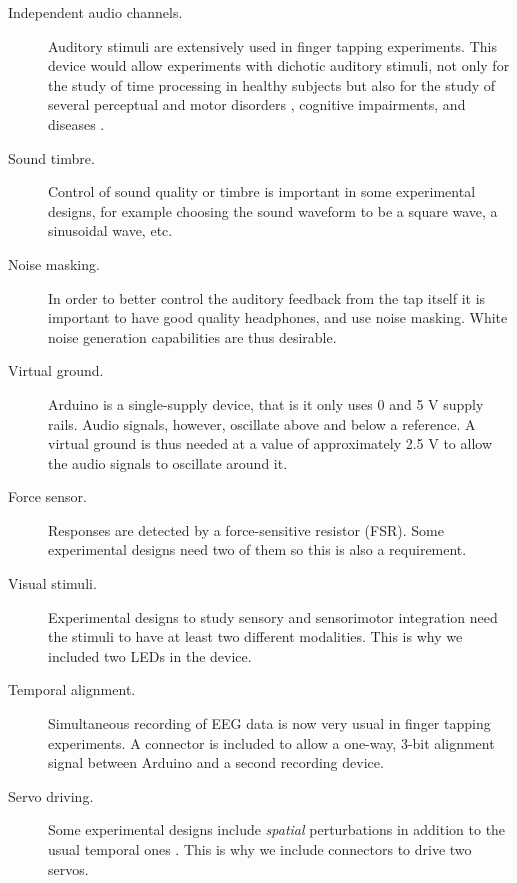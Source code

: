 \documentclass[twocolumn]{article}
\begin{document}
\begin{description}
    \item[Independent audio channels.] Auditory stimuli are extensively used in finger tapping experiments. This device would allow experiments with dichotic auditory stimuli, not only for the study of time processing in healthy subjects \cite{Piazza1977} but also for the study of several perceptual and motor disorders \cite{Hugdahl1989}, cognitive impairments, and diseases \cite{Sebaiti2022}.

    \item[Sound timbre.] Control of sound quality or timbre is important in some experimental designs, for example choosing the sound waveform to be a square wave, a sinusoidal wave, etc.

    \item[Noise masking.] In order to better control the auditory feedback from the tap itself it is important to have good quality headphones, and use noise masking. White noise generation capabilities are thus desirable.
    
    \item[Virtual ground.] Arduino is a single-supply device, that is it only uses 0 and 5 V supply rails. Audio signals, however, oscillate above and below a reference. A virtual ground is thus needed at a value of approximately 2.5 V to allow the audio signals to oscillate around it.
    
    \item[Force sensor.] Responses are detected by a force-sensitive resistor (FSR). Some experimental designs need two of them \cite{Versaci2021} so this is also a requirement.
    
    \item[Visual stimuli.] Experimental designs to study sensory and sensorimotor integration need the stimuli to have at least two different modalities. This is why we included two LEDs in the device.

    \item[Temporal alignment.] Simultaneous recording of EEG data is now very usual in finger tapping experiments. A connector is included to allow a one-way, 3-bit alignment signal between Arduino and a second recording device.

    \item[Servo driving.] Some experimental designs include {\em spatial} perturbations in addition to the usual temporal ones \cite{Lopez2019}. This is why we include connectors to drive two servos.
\end{description}
\end{document}

